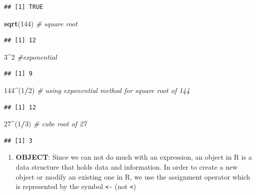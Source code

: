 \documentclass[
]{article}
\newenvironment{Shaded}{\begin{snugshade}}{\end{snugshade}}
\newcommand{\CommentTok}[1]{\textcolor[rgb]{0.56,0.35,0.01}{\textit{#1}}}
\newcommand{\DecValTok}[1]{\textcolor[rgb]{0.00,0.00,0.81}{#1}}
\newcommand{\FunctionTok}[1]{\textcolor[rgb]{0.13,0.29,0.53}{\textbf{#1}}}
\newcommand{\NormalTok}[1]{#1}
\newcommand{\SpecialCharTok}[1]{\textcolor[rgb]{0.81,0.36,0.00}{\textbf{#1}}}
\providecommand{\tightlist}{%
  \setlength{\itemsep}{0pt}\setlength{\parskip}{0pt}}
\begin{document}
\begin{verbatim}
## [1] TRUE
\end{verbatim}

\begin{Shaded}
\begin{Highlighting}[]
\FunctionTok{sqrt}\NormalTok{(}\DecValTok{144}\NormalTok{) }\CommentTok{\# square root}
\end{Highlighting}
\end{Shaded}

\begin{verbatim}
## [1] 12
\end{verbatim}

\begin{Shaded}
\begin{Highlighting}[]
\DecValTok{3}\SpecialCharTok{\^{}}\DecValTok{2}  \CommentTok{\#exponential}
\end{Highlighting}
\end{Shaded}

\begin{verbatim}
## [1] 9
\end{verbatim}

\begin{Shaded}
\begin{Highlighting}[]
\DecValTok{144}\SpecialCharTok{\^{}}\NormalTok{(}\DecValTok{1}\SpecialCharTok{/}\DecValTok{2}\NormalTok{) }\CommentTok{\# using exponential method for square root of 144}
\end{Highlighting}
\end{Shaded}

\begin{verbatim}
## [1] 12
\end{verbatim}

\begin{Shaded}
\begin{Highlighting}[]
\DecValTok{27}\SpecialCharTok{\^{}}\NormalTok{(}\DecValTok{1}\SpecialCharTok{/}\DecValTok{3}\NormalTok{) }\CommentTok{\# cube root of 27}
\end{Highlighting}
\end{Shaded}

\begin{verbatim}
## [1] 3
\end{verbatim}

\begin{enumerate}
\def\labelenumi{\arabic{enumi}.}
\setcounter{enumi}{1}
\tightlist
\item
  \textbf{OBJECT}: Since we can not do much with an expression, an
  object in R is a data structure that holds data and information. In
  order to create a new object or modify an existing one in R, we use
  the assignment operator which is represented by the symbol
  \texttt{\textless{}-} (not \texttt{\textless{}})
\end{enumerate}
\end{document}

